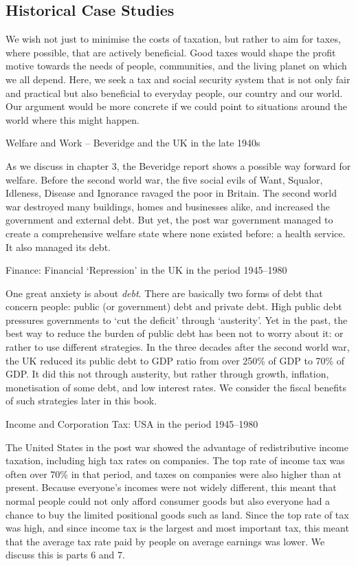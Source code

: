 \documentclass[]{tufte-handout}
\begin{document}
\hypertarget{historical-case-studies}{%
\subsection{\texorpdfstring{\textbf{Historical Case
Studies}}{Historical Case Studies}}\label{historical-case-studies}}

We wish not just to minimise the costs of taxation, but rather to aim
for taxes, where possible, that are actively beneficial. Good taxes
would shape the profit motive towards the needs of people, communities,
and the living planet on which we all depend. Here, we seek a tax and
social security system that is not only fair and practical but also
beneficial to everyday people, our country and our world. Our argument
would be more concrete if we could point to situations around the world
where this might happen.

Welfare and Work -- Beveridge and the UK in the late 1940s

As we discuss in chapter 3, the Beveridge report shows a possible way
forward for welfare. Before the second world war, the five social evils
of Want, Squalor, Idleness, Disease and Ignorance ravaged the poor in
Britain. The second world war destroyed many buildings, homes and
businesses alike, and increased the government and external debt. But
yet, the post war government managed to create a comprehensive welfare
state where none existed before: a health service. It also managed its
debt.

Finance: Financial `Repression' in the UK in the period 1945--1980

One great anxiety is about \emph{debt}. There are basically two forms of
debt that concern people: public (or government) debt and private debt.
High public debt pressures governments to `cut the deficit' through
`austerity'. Yet in the past, the best way to reduce the burden of
public debt has been not to worry about it: or rather to use different
strategies. In the three decades after the second world war, the UK
reduced its public debt to GDP ratio from over 250\% of GDP to 70\% of
GDP. It did this not through austerity, but rather through growth,
inflation, monetisation of some debt, and low interest rates. We
consider the fiscal benefits of such strategies later in this book.

Income and Corporation Tax: USA in the period 1945--1980

The United States in the post war showed the advantage of redistributive
income taxation, including high tax rates on companies. The top rate of
income tax was often over 70\% in that period, and taxes on companies
were also higher than at present. Because everyone's incomes were not
widely different, this meant that normal people could not only afford
consumer goods but also everyone had a chance to buy the limited
positional goods such as land. Since the top rate of tax was high, and
since income tax is the largest and most important tax, this meant that
the average tax rate paid by people on average earnings was lower. We
discuss this is parts 6 and 7.
\end{document}

